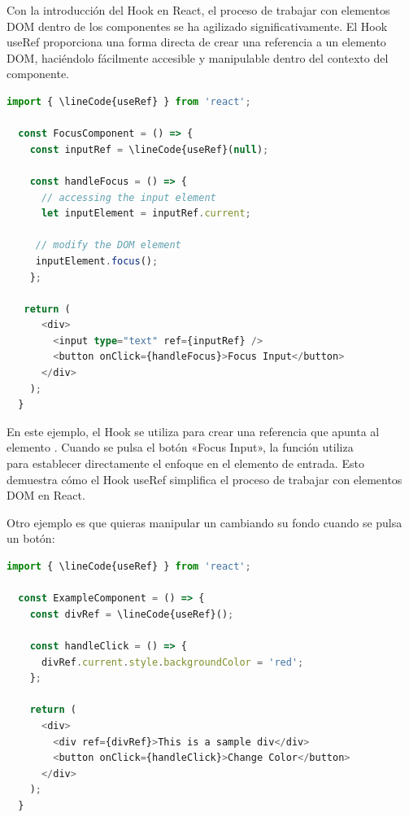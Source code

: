 Con la introducción del Hook  en React, el proceso de trabajar con elementos DOM dentro de los componentes se ha agilizado significativamente. El Hook useRef proporciona una forma directa de crear una referencia a un elemento DOM, haciéndolo fácilmente accesible y manipulable dentro del contexto del componente.
\vspace{0.2cm} %

\begin{lstlisting}[language=TypeScript, style=mystyle]
  import { \lineCode{useRef} } from 'react';

  const FocusComponent = () => {
    const inputRef = \lineCode{useRef}(null);

    const handleFocus = () => {
      // accessing the input element
      let inputElement = inputRef.current;

     // modify the DOM element
     inputElement.focus();
    };

   return (
      <div>
        <input type="text" ref={inputRef} />
        <button onClick={handleFocus}>Focus Input</button>
      </div>
    );
  }
\end{lstlisting}

En este ejemplo, el Hook  se utiliza para crear una referencia  que apunta al elemento . Cuando se pulsa el botón «Focus Input», la función  utiliza\\  para establecer directamente el enfoque en el elemento de entrada. Esto demuestra cómo el Hook useRef simplifica el proceso de trabajar con elementos DOM en React.

Otro ejemplo es que quieras manipular un  cambiando su fondo cuando se pulsa un botón:
\vspace{0.2cm} %

\begin{lstlisting}[language=TypeScript, style=mystyle]
  import { \lineCode{useRef} } from 'react';

  const ExampleComponent = () => {
    const divRef = \lineCode{useRef}();

    const handleClick = () => {
      divRef.current.style.backgroundColor = 'red';
    };

    return (
      <div>
        <div ref={divRef}>This is a sample div</div>
        <button onClick={handleClick}>Change Color</button>
      </div>
    );
  }
\end{lstlisting}



